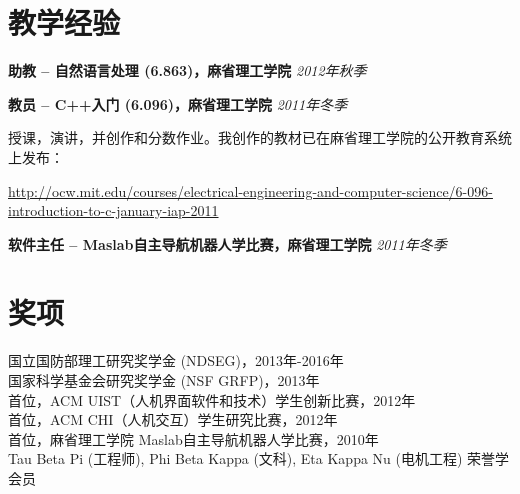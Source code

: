 \documentclass[margin,line]{resume}
\begin{document}
\begin{resume}
\section{\mysidestyle 教学经验}

\textbf{助教 -- 自然语言处理 (6.863)，麻省理工学院} \hfill \textsl{2012年秋季} \\

\vspace{-5mm}

\textbf{教员 -- C++入门 (6.096)，麻省理工学院} \hfill \textsl{2011年冬季}\\

\vspace{-4mm}

\vspace{-4mm}

授课，演讲，并创作和分数作业。我创作的教材已在麻省理工学院的公开教育系统上发布：

\vspace{-4mm}

\url{http://ocw.mit.edu/courses/electrical-engineering-and-computer-science/6-096-introduction-to-c-january-iap-2011} \\

\vspace{-5mm}

\textbf{软件主任 -- Maslab自主导航机器人学比赛，麻省理工学院} \hfill \textsl{2011年冬季}\\

\vspace{-4mm}

\section{\mysidestyle 奖项}

国立国防部理工研究奖学金 (NDSEG)，2013年-2016年 \\
国家科学基金会研究奖学金 (NSF GRFP)，2013年 \\
首位，ACM UIST（人机界面软件和技术）学生创新比赛，2012年 \\
首位，ACM CHI（人机交互）学生研究比赛，2012年 \\
首位，麻省理工学院 Maslab自主导航机器人学比赛，2010年 \\
Tau Beta Pi (工程师), Phi Beta Kappa (文科), Eta Kappa Nu (电机工程) 荣誉学会员 \\

\pagebreak



\end{resume}
\end{document}
